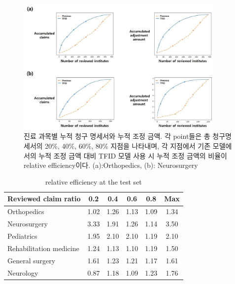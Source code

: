 \documentclass[11pt]{article}           %
\begin{document}
\begin{figure}[h]
   \centering
   \vspace{0.5cm}
   \includegraphics[width=0.9\textwidth]{[figure9]plot_efficiency.jpg}
   \vspace{-0.5cm}
   \caption{진료 과목별 누적 청구 명세서와 누적 조정 금액. 각 point들은 총 청구명세서의 20\%, 40\%, 60\%, 80\% 지점을 나타내며, 각 지점에서 기존 모델에서의 누적 조정 금액 대비 TFID 모델 사용 시 누적 조정 금액의 비율이 relative efficiency이다. (a):Orthopedics, (b): Neurosurgery}
   \vspace{0.5cm}
   \label{fig:plot efficiency}
\end{figure}


\begin{table}[]
    \centering
    \caption{relative efficiency at the test set}
    \vspace{0.5cm}
    \label{table: relative efficiency 1}
    \begin{tabular}{@{}lccccc@{}}
    \toprule
    Reviewed claim ratio    & 0.2  & 0.4  & 0.6  & 0.8  & Max  \\ \midrule
    Orthopedics             & 1.02 & 1.26 & 1.13 & 1.09 & 1.34 \\
    Neurosurgery            & 3.33 & 1.91 & 1.26 & 1.14 & 3.50 \\
    Pediatrics              & 1.95 & 2.10 & 2.10 & 1.19 & 2.10 \\
    Rehabilitation medicine & 1.24 & 1.13 & 1.10 & 1.19 & 1.50 \\
    General surgery         & 1.61 & 1.23 & 1.21 & 1.17 & 1.61 \\
    Neurology               & 0.87 & 1.18 & 1.09 & 1.23 & 1.76 \\ \bottomrule
    \end{tabular}
\end{table}
\end{document}
